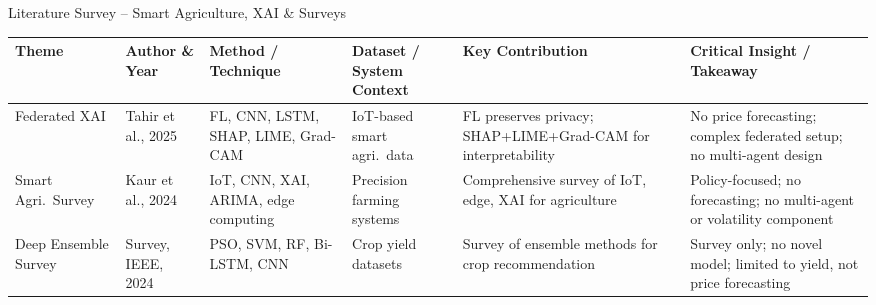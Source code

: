\documentclass{beamer}
\begin{document}
\begin{frame}[label=lit_xai]{Literature Survey -- Smart Agriculture, XAI \& Surveys}
\setlength{\tabcolsep}{2pt}
\renewcommand{\arraystretch}{1.3}
\tiny

\begin{tcolorbox}[enhanced, colback=white, colframe=accentred!40, arc=4pt, boxrule=0.3pt,
  left=1pt, right=1pt, top=2pt, bottom=2pt, shadow={1pt}{-1pt}{0pt}{black!10}]
\begin{adjustbox}{max width=\textwidth, max height=0.7\textheight}
\begin{tabular}{|L{1.5cm}|L{1.4cm}|L{1.6cm}|L{1.8cm}|L{2.0cm}|L{2.3cm}|}
\hline
{}
\textbf{Theme} & \textbf{Author \& Year} & \textbf{Method / Technique} & \textbf{Dataset / System Context} & \textbf{Key Contribution} & \textbf{Critical Insight / Takeaway} \\
\hline
Federated XAI & Tahir et al., 2025 & FL, CNN, LSTM, SHAP, LIME, Grad-CAM & IoT-based smart agri.\ data & FL preserves privacy; SHAP+LIME+Grad-CAM for interpretability & No price forecasting; complex federated setup; no multi-agent design \\ \hline
Smart Agri.\ Survey & Kaur et al., 2024 & IoT, CNN, XAI, ARIMA, edge computing & Precision farming systems & Comprehensive survey of IoT, edge, XAI for agriculture & Policy-focused; no forecasting; no multi-agent or volatility component \\ \hline
Deep Ensemble Survey & Survey, IEEE, 2024 & PSO, SVM, RF, Bi-LSTM, CNN & Crop yield datasets & Survey of ensemble methods for crop recommendation & Survey only; no novel model; limited to yield, not price forecasting \\ \hline
\end{tabular}
\end{adjustbox}
\end{tcolorbox}

\end{frame}
\end{document}
